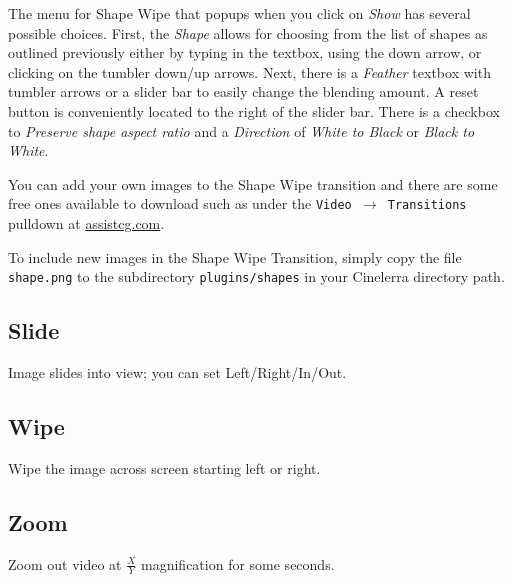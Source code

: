 The menu for Shape Wipe that popups when you click on \textit{Show} has several possible choices.  First, the \textit{Shape} allows for choosing from the list of shapes as outlined previously either by typing in the textbox, using the down arrow, or clicking on the tumbler down/up arrows.
Next, there is a \textit{Feather} textbox with tumbler arrows or a slider bar to easily change the blending amount.  A reset button is conveniently located to the right of the slider bar.  There is a checkbox to \textit{Preserve shape aspect ratio} and a \textit{Direction} of \textit{White to Black} or \textit{Black to White}.

You can add your own images to the Shape Wipe transition and there are some free ones available to download such as under the \texttt{Video $\rightarrow$ Transitions} pulldown at {\small \url{assistcg.com}}.

To include new images in the Shape Wipe Transition, simply copy the file \texttt{{shape}.png} to the
 subdirectory \texttt{plugins/shapes} in your Cinelerra directory path.

\subsection*{Slide}%
\label{sub:slide}

Image slides into view; you can set Left/Right/In/Out.

\subsection*{Wipe}%
\label{sub:wipe}

Wipe the image across screen starting left or right.

\subsection*{Zoom}%
\label{sub:zoom}

Zoom out video at $\frac{X}{Y}$ magnification for some seconds.

